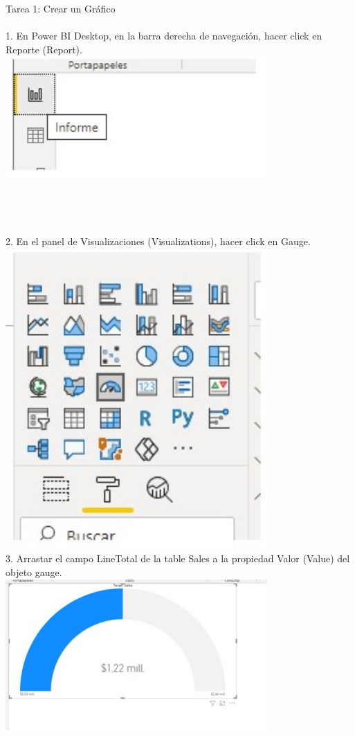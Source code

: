 \documentclass[preprint,12pt]{elsarticle}
\begin{document}
	\begin{itemize}
			Tarea 1: Crear un Gráfico\\ 
			\\ 1. En Power BI Desktop, en la barra derecha de navegación, hacer click en Reporte (Report).
				\\ \includegraphics[width=10cm]{./IMAGENES/4.1} \\
			\\ \\ \\ \\ 2. En el panel de Visualizaciones (Visualizations), hacer click en Gauge.
				\\ \includegraphics[width=10cm]{./IMAGENES/4.2} \\
			3. Arrastar el campo LineTotal de la table Sales a la propiedad Valor (Value) del objeto gauge.
				\\ \includegraphics[width=10cm]{./IMAGENES/4.3} \\

\end{itemize}
\end{document}
